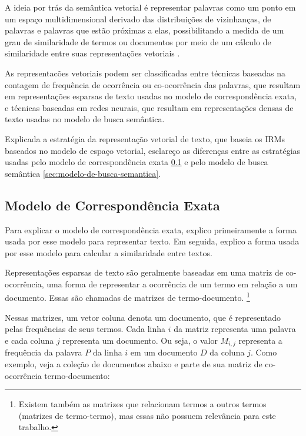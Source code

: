 \documentclass[
	12pt,				%
	openright,			%
	oneside,			%
	a4paper,			%
	english,			%
	french,				%
	spanish,			%
	brazil				%
	]{abntex2}
\begin{document}
A ideia por trás da semântica vetorial é representar palavras como um ponto em um espaço multidimensional derivado das distribuições de vizinhanças, de palavras e palavras que estão próximas a elas,
possibilitando a medida de um grau de similaridade de termos ou documentos por meio de um cálculo de similaridade entre suas representações vetoriais \cite{JurafskyMartin2023}.

As representacões vetoriais podem ser classificadas entre técnicas baseadas na contagem de frequência de ocorrência
ou co-ocorrência das palavras, que resultam em representações esparsas de texto usadas no modelo de correspondência exata, e técnicas baseadas em redes neurais, que resultam
em representações densas de texto usadas no modelo de busca semântica.

Explicada a estratégia da representação vetorial de texto, que baseia os IRMs baseados no modelo de espaço vetorial, esclareço as diferenças entre as estratégias usadas pelo modelo de correspondência exata \ref{sec:modelo-de-correspondencia-exata} e pelo modelo de busca semântica \ref{sec:modelo-de-busca-semantica}.

\subsection{Modelo de Correspondência Exata}\label{sec:modelo-de-correspondencia-exata}

Para explicar o modelo de correspondência exata, explico primeiramente a forma usada por esse modelo para representar texto. Em seguida, explico a forma usada por esse modelo para calcular a similaridade entre textos.

Representações esparsas de texto são geralmente baseadas em uma matriz de co-ocorrência, uma forma de representar a ocorrência de um
termo em relação a um documento.
Essas são chamadas de matrizes de termo-documento.
\footnote{Existem também as matrizes que relacionam termos a outros termos (matrizes de termo-termo), mas essas não possuem relevância para este trabalho.}
\cite{JurafskyMartin2023}

Nessas matrizes, um vetor coluna denota um documento, que é representado pelas frequências de seus termos.
Cada linha $i$ da matriz representa uma palavra e cada coluna $j$ representa um documento.
Ou seja, o valor $M_{i,j}$ representa a frequência da palavra $P$ da linha $i$ em um documento $D$ da coluna $j$.
Como exemplo, veja a coleção de documentos abaixo e parte de sua matriz de co-ocorrência termo-documento:
\end{document}
